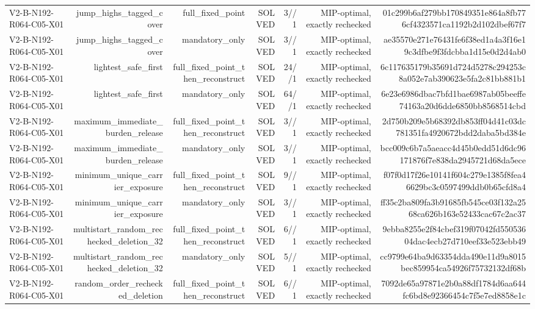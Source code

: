 {\begin{longtable}{lrrrrrr}
V2-B-N192-R064-C05-X01 & jump\_highs\_tagged\_cover & full\_fixed\_point & SOLVED & 3//1 & MIP-optimal, exactly rechecked & 01c299b6af279bb170849351e864a8fb776cf4323571ca1192b2d102dbef67f7 \\
V2-B-N192-R064-C05-X01 & jump\_highs\_tagged\_cover & mandatory\_only & SOLVED & 3//1 & MIP-optimal, exactly rechecked & ae35570e271e76431fe6f38ed1a4a3f16e19c3dfbe9f3fdcbba1d15e0d2d4ab0 \\
V2-B-N192-R064-C05-X01 & lightest\_safe\_first & full\_fixed\_point\_then\_reconstruct & SOLVED & 24//1 & MIP-optimal, exactly rechecked & 6c117635179b35691d724d5278c294253c8a052e7ab390623e5fa2c81bb881b1 \\
V2-B-N192-R064-C05-X01 & lightest\_safe\_first & mandatory\_only & SOLVED & 64//1 & MIP-optimal, exactly rechecked & 6e23e6986dbac7bfd1bae6987ab05beeffe74163a20d6dde6850bb8568514cbd \\
V2-B-N192-R064-C05-X01 & maximum\_immediate\_burden\_release & full\_fixed\_point\_then\_reconstruct & SOLVED & 3//1 & MIP-optimal, exactly rechecked & 2d750b209e5b68392db853ff04d41c03dc781351fa4920672bdd2daba5bd384e \\
V2-B-N192-R064-C05-X01 & maximum\_immediate\_burden\_release & mandatory\_only & SOLVED & 3//1 & MIP-optimal, exactly rechecked & bcc009c6b7a5aeacc4d45b0edd51d6dc96171876f7e838da2945721d68da5ece \\
V2-B-N192-R064-C05-X01 & minimum\_unique\_carrier\_exposure & full\_fixed\_point\_then\_reconstruct & SOLVED & 9//1 & MIP-optimal, exactly rechecked & f07f0d17f26e10141f604c279e1385f8fea46629bc3c0597499ddb0b65cfd8a4 \\
V2-B-N192-R064-C05-X01 & minimum\_unique\_carrier\_exposure & mandatory\_only & SOLVED & 3//1 & MIP-optimal, exactly rechecked & ff35c2ba809fa3b91685fb545ce03f132a2568ca626b163e52433cac67c2ac37 \\
V2-B-N192-R064-C05-X01 & multistart\_random\_rechecked\_deletion\_32 & full\_fixed\_point\_then\_reconstruct & SOLVED & 6//1 & MIP-optimal, exactly rechecked & 9ebba8255e2f84cbef319f07042fd55053604dac4ecb27d710eef33e523ebb49 \\
V2-B-N192-R064-C05-X01 & multistart\_random\_rechecked\_deletion\_32 & mandatory\_only & SOLVED & 5//1 & MIP-optimal, exactly rechecked & cc9799e64ba9d63354dda490e11d9a8015bec859954ca54926f75732132df68b \\
V2-B-N192-R064-C05-X01 & random\_order\_rechecked\_deletion & full\_fixed\_point\_then\_reconstruct & SOLVED & 6//1 & MIP-optimal, exactly rechecked & 7092de65a97871e2b0a88df1784d6aa644fc6bd8e92366454c7f5e7ed8858e1c \\

\end{longtable}}
